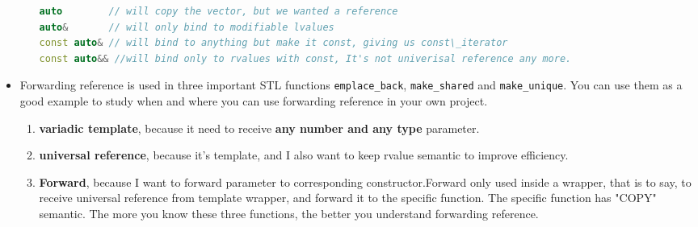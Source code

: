 \documentclass[a4paper,11pt,twoside]{book}
\begin{document}
\begin{itemize}
\begin{enumerate}
\begin{lstlisting}[frame=single, language=c++]
auto        // will copy the vector, but we wanted a reference
auto&       // will only bind to modifiable lvalues
const auto& // will bind to anything but make it const, giving us const\_iterator
const auto&& //will bind only to rvalues with const, It's not univerisal reference any more. 
\end{lstlisting} 
	\end{enumerate}

\item Forwarding reference is used in three important STL functions \texttt{emplace\_back}, \texttt{make\_shared} and \texttt{make\_unique}. You can use them as a good example to study when and where you can use forwarding reference in your own project.
	\begin{enumerate}
		\item \textbf{variadic template}, because it need to receive \textbf{any number and any type} parameter.

		\item \textbf{universal reference}, because it's template, and I also want to keep rvalue semantic to improve efficiency. 
		
		\item \textbf{Forward}, because I want to forward parameter to corresponding constructor.Forward only used inside a wrapper, that is to say, to receive universal reference from template wrapper, and forward it to the specific function. The specific function has "COPY" semantic. The more you know these three functions, the better you understand forwarding reference.
	\end{enumerate}
\end{itemize}
\end{document}
